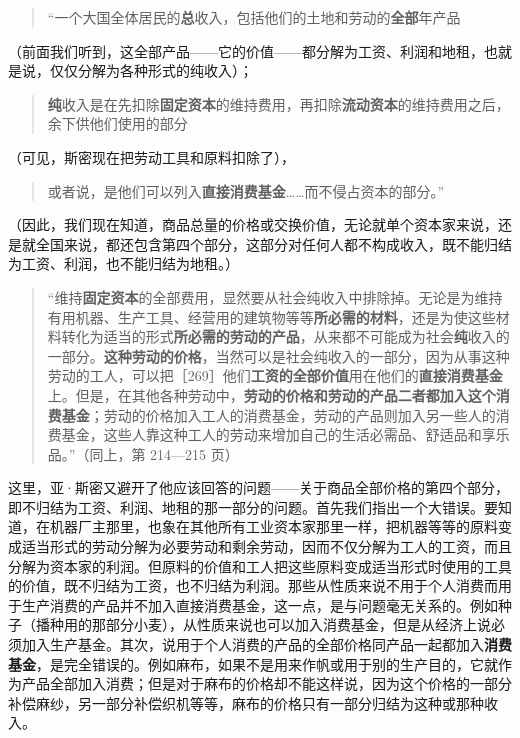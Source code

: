 \begin{quote}“一个大国全体居民的\textbf{总}收入，包括他们的土地和劳动的\textbf{全部}年产品\end{quote}

（前面我们听到，这全部产品——它的价值——都分解为工资、利润和地租，也就是说，仅仅分解为各种形式的纯收入）；

\begin{quote}\textbf{纯}收入是在先扣除\textbf{固定资本}的维持费用，再扣除\textbf{流动资本}的维持费用之后，余下供他们使用的部分\end{quote}

（可见，斯密现在把劳动工具和原料扣除了），

\begin{quote}或者说，是他们可以列入\textbf{直接消费基金}……而不侵占资本的部分。”\end{quote}

（因此，我们现在知道，商品总量的价格或交换价值，无论就单个资本家来说，还是就全国来说，都还包含第四个部分，这部分对任何人都不构成收入，既不能归结为工资、利润，也不能归结为地租。）

\begin{quote}“维持\textbf{固定资本}的全部费用，显然要从社会纯收入中排除掉。无论是为维持有用机器、生产工具、经营用的建筑物等等\textbf{所必需的材料}，还是为使这些材料转化为适当的形式\textbf{所必需的劳动的产品}，从来都不可能成为社会\textbf{纯}收入的一部分。\textbf{这种劳动的价格}，当然可以是社会纯收入的一部分，因为从事这种劳动的工人，可以把［269］他们\textbf{工资的全部价值}用在他们的\textbf{直接消费基金}上。但是，在其他各种劳动中，\textbf{劳动的价格和劳动的产品二者都加入这个消费基金}；劳动的价格加入工人的消费基金，劳动的产品则加入另一些人的消费基金，这些人靠这种工人的劳动来增加自己的生活必需品、舒适品和享乐品。”（同上，第 214—215 页）\end{quote}

这里，亚·斯密又避开了他应该回答的问题——关于商品全部价格的第四个部分，即不归结为工资、利润、地租的那一部分的问题。首先我们指出一个大错误。要知道，在机器厂主那里，也象在其他所有工业资本家那里一样，把机器等等的原料变成适当形式的劳动分解为必要劳动和剩余劳动，因而不仅分解为工人的工资，而且分解为资本家的利润。但原料的价值和工人把这些原料变成适当形式时使用的工具的价值，既不归结为工资，也不归结为利润。那些从性质来说不用于个人消费而用于生产消费的产品并不加入直接消费基金，这一点，是与问题毫无关系的。例如种子（播种用的那部分小麦），从性质来说也可以加入消费基金，但是从经济上说必须加入生产基金。其次，说用于个人消费的产品的全部价格同产品一起都加入\textbf{消费基金}，是完全错误的。例如麻布，如果不是用来作帆或用于别的生产目的，它就作为产品全部加入消费；但是对于麻布的价格却不能这样说，因为这个价格的一部分补偿麻纱，另一部分补偿织机等等，麻布的价格只有一部分归结为这种或那种收入。

